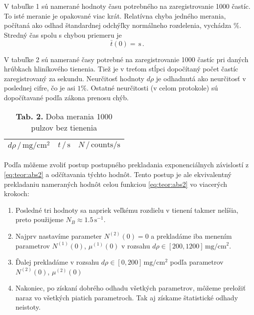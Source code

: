 \documentclass[a4paper, 10pt]{article}
\newcommand{\unit}[1]{\ensuremath{\, \mathrm{#1}}}
\begin{document}
V tabuľke 1 sú namerané hodnoty času potrebného na zaregistrovanie 1000 častíc. To isté meranie je opakované viac krát. Relatívna chyba jedného merania, počítaná ako odhad štandardnej odchýľky normálneho rozdelenia, vychádza $\%$. Stredný čas spolu s chybou priemeru je 
$$\bar t(0) =  \unit s\,.$$

V tabuľke 2 sú namerané časy potrebné na zaregistrovanie 1000 častíc pri daných hrúbkach hliníkového tienenia. Tiež je v treťom stĺpci dopočítaný počet častíc zaregistrovaný za sekundu. Neurčitosť hodnoty $d\rho$ je odhadnutá ako neurčitosť v poslednej cifre, čo je asi $1\%$. Ostatné neurčitosti (v celom protokole) sú dopočítavané podľa zákona prenosu chýb.

\begin{table}[h!]
\centering
\begin{tabular}{c|c|c}
$ d\rho\,/\unit {mg/cm^2} $ & $t\,/\unit{s}$ & $N \,/\unit{counts/s}$ \\
\midrule

\end{tabular}
\caption*{\textbf{ Tab. 2.} Doba merania 1000 pulzov bez tienenia}
\end{table}

Podľa \cite{stud} môžeme zvoliť postup postupného prekladania exponenciálnych závislostí z \ref{eq:teor:abs2} a odčítavania týchto hodnôt. Tento postup je ale ekvivalentný prekladaniu nameraných hodnôt celou funkciou \ref{eq:teor:abs2} vo viacerých krokoch:
\begin{enumerate}
    \item Posledné tri hodnoty sa napriek veľkému rozdielu v tienení takmer nelíšia, preto použijeme $N_B \approx 1.5\unit s^{-1}$. 
    \item Najprv nastavíme parameter $N^{(2)}(0) = 0$ a prekladáme iba menením parametrov $N^{(1)}(0)$, $\mu^{(1)}(0)$ v rozsahu $d\rho \in [200, 1200]\unit {mg/cm^2}$.
    \item Ďalej prekladáme v rozsahu $d\rho \in [0, 200]\unit {mg/cm^2}$ podľa parametrov $N^{(2)}(0)$, $\mu^{(2)}(0)$
    \item Nakoniec, po získaní dobrého odhadu všetkých parametrov, môžeme preložiť naraz vo všetkých piatich parametroch. Tak aj získame štatistické odhady neistoty.
\end{enumerate}
\end{document}
